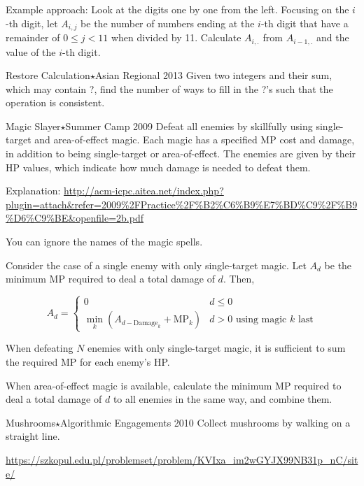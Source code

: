 Example approach: Look at the digits one by one from the left. Focusing on the $i$-th digit, let $A_{i,j}$ be the number of numbers ending at the $i$-th digit that have a remainder of $0 \le j < 11$ when divided by 11. Calculate $A_{i,.}$ from $A_{i-1,.}$ and the value of the $i$-th digit.

\begin{pbox}{Restore Calculation$\star$}{Asian Regional 2013}
Given two integers and their sum, which may contain ?, find the number of ways to fill in the ?'s such that the operation is consistent.

\end{pbox}

\begin{pbox}{Magic Slayer$\star$}{Summer Camp 2009}
Defeat all enemies by skillfully using single-target and area-of-effect magic. Each magic has a specified MP cost and damage, in addition to being single-target or area-of-effect. The enemies are given by their HP values, which indicate how much damage is needed to defeat them.

\end{pbox}

Explanation: \url{http://acm-icpc.aitea.net/index.php?plugin=attach&refer=2009%2FPractice%2F%B2%C6%B9%E7%BD%C9%2F%B9%D6%C9%BE&openfile=2b.pdf}

You can ignore the names of the magic spells.

Consider the case of a single enemy with only single-target magic. Let $A_d$ be the minimum MP required to deal a total damage of $d$. Then,

\begin{equation}
  A_d = \left\{
  \begin{array}{ll}
    0 & d\le 0\\
    \min_k(A_{d-\mbox{Damage}_k} + \mbox{MP}_k) & d > 0 \mbox{ using magic $k$ last}
  \end{array}\right.
\end{equation}

When defeating $N$ enemies with only single-target magic, it is sufficient to sum the required MP for each enemy's HP.

When area-of-effect magic is available, calculate the minimum MP required to deal a total damage of $d$ to all enemies in the same way, and combine them.

\begin{pbox}{Mushrooms$\star$}{Algorithmic Engagements 2010}
Collect mushrooms by walking on a straight line.

\url{https://szkopul.edu.pl/problemset/problem/KVIxa_im2wGYJX99NB31p_nC/site/}
\end{pbox}

